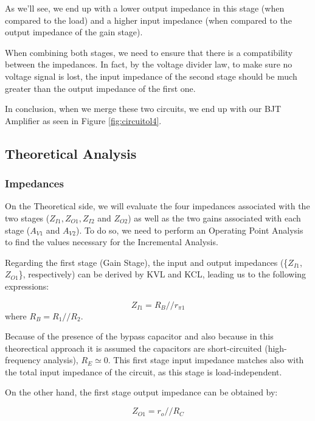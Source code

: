 As we'll see, we end up with a lower output impedance in this stage (when compared to the load) and a higher input impedance (when compared to the output impedance of the gain stage).

When combining both stages, we need to ensure that there is a compatibility  between the impedances. In fact, by the voltage divider law, to make sure no voltage signal is lost, the input impedance of the second stage should be much greater than the output impedance of the first one. 

In conclusion, when we merge these two circuits, we end up with our BJT Amplifier as seen in Figure \ref{fig:circuitol4}.

\clearpage
\subsection{Theoretical Analysis}
\label{subsec:Req}

\subsubsection{Impedances}

On the Theoretical side, we will evaluate the four impedances associated with the two stages ($Z_{I1}, Z_{O1}, Z_{I2}$ and $Z_{O2}$) as well as the two gains associated with each stage ($A_{V1}$ and $A_{V2}$).
To do so, we need to perform an Operating Point Analysis to find the values necessary for the Incremental Analysis.

Regarding the first stage (Gain Stage), the input and output impedances (\{$Z_{I1}$, $Z_{O1}$\}, respectively) can be derived by KVL and KCL, leading us to the following expressions:

\begin{equation}
    Z_{I1}=R_B // r_{\pi 1}
\end{equation}
where $R_B=R_1 // R_2$.

Because of the presence of the bypass capacitor and also because in this theorectical approach it is assumed the capacitors are short-circuited (high-frequency analysis), $R_E \simeq 0$. This first stage input impedance matches also with the total input impedance of the circuit, as this stage is load-independent.

On the other hand, the first stage output impedance can be obtained by:

\begin{equation}
    Z_{O1}=r_o // R_C  
\end{equation}

